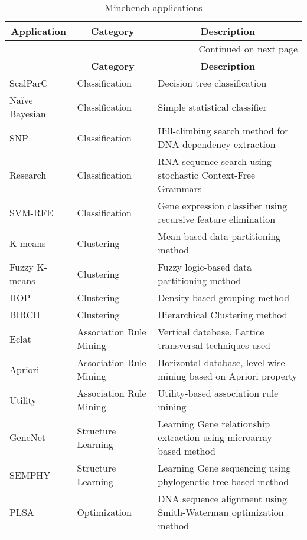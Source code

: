 \begin{longtable}{|l|X|X|}
\caption{Minebench applications} \label{tab:minebench} \\

\hline 
\endfirsthead

\hline
\multicolumn{1}{|c|}{\textbf{Application}} & \multicolumn{1}{c|}{\textbf{Category}} & \multicolumn{1}{c|}{\textbf{Description}}\\
\hline 
\endhead

\hline \multicolumn{3}{|r|}{{Continued on next page}} \\ \hline
\endfoot

\hline
\endlastfoot

\multicolumn{1}{|c|}{\textbf{Application}} & \multicolumn{1}{c|}{\textbf{Category}} & \multicolumn{1}{c|}{\textbf{Description}}\\ \hline


ScalParC       & Classification          & Decision tree classification                                        \\ \hline
Naïve Bayesian & Classification          & Simple statistical classifier                                       \\ \hline
SNP            & Classification          & Hill-climbing search method for DNA dependency extraction           \\ \hline
Research       & Classification          & RNA sequence search using stochastic Context-Free Grammars          \\ \hline
SVM-RFE        & Classification          & Gene expression classifier using recursive feature elimination      \\ \hline
K-means        & Clustering              & Mean-based data partitioning method                                 \\ \hline
Fuzzy K-means  & Clustering              & Fuzzy logic-based data partitioning method                          \\ \hline
HOP            & Clustering              & Density-based grouping method                                       \\ \hline
BIRCH          & Clustering              & Hierarchical Clustering method                                      \\ \hline
Eclat          & Association Rule Mining & Vertical database, Lattice transversal techniques used              \\ \hline
Apriori        & Association Rule Mining & Horizontal database, level-wise mining based on Apriori property    \\ \hline
Utility        & Association Rule Mining & Utility-based association rule mining                               \\ \hline
GeneNet        & Structure Learning      & Learning Gene relationship extraction using microarray-based method \\ \hline
SEMPHY         & Structure Learning      & Learning Gene sequencing using phylogenetic tree-based method       \\ \hline
PLSA           & Optimization            & DNA sequence alignment using Smith-Waterman optimization method    
\end{longtable}